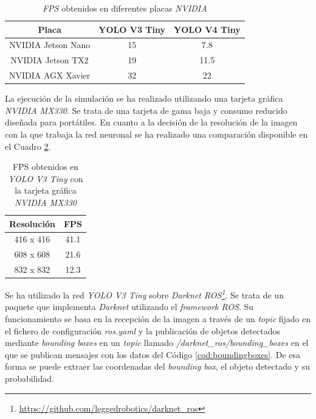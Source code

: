 \begin{table}[H]
	\begin{center}
		\begin{tabular}{|c|c|c|}
			\hline
			\textbf{Placa}   & \textbf{YOLO V3 Tiny}  & \textbf{YOLO V4 Tiny}
			\\
			\hline
			NVIDIA Jetson Nano						& 15									& 7.8
			\\																						
			NVIDIA Jetson TX2   					& 19									& 11.5
			\\
			NVIDIA AGX Xavier     				& 32									& 22
			\\
			\hline
		\end{tabular}
		\caption{\textit{FPS} obtenidos en diferentes placas \textit{NVIDIA}}
		\label{table:v3vsv4}
	\end{center}
\end{table}

La ejecución de la simulación se ha realizado utilizando una tarjeta gráfica \textit{NVIDIA MX330}. Se trata de una tarjeta de gama baja y consumo reducido diseñada para portátiles. En cuanto a la decisión de la resolución de la imagen con la que trabaja la red neuronal se ha realizado una comparación disponible en el Cuadro \ref{table:versusnotebook}.\\

\begin{table}[H]
	\begin{center}
		\begin{tabular}{|c|c|}
			\hline
			\textbf{Resolución}   & \textbf{FPS}
			\\
			\hline
			416 x 416							& 41.1
			\\
			608 x 608    					& 21.6
			\\
			832 x 832      				& 12.3
			\\
			\hline
		\end{tabular}
		\caption{FPS obtenidos en \textit{YOLO V3 Tiny} con la tarjeta gráfica \textit{NVIDIA MX330}}
		\label{table:versusnotebook}
	\end{center}
\end{table}

Se ha utilizado la red \textit{YOLO V3 Tiny} sobre \textit{Darknet ROS\footnote{\url{https://github.com/leggedrobotics/darknet_ros}}}. Se trata de un paquete que implementa \textit{Darknet} utilizando el \textit{framework ROS}. Su funcionamiento se basa en la recepción de la imagen a través de un \textit{topic} fijado en el fichero de configuración \textit{ros.yaml} y la publicación de objetos detectados mediante \textit{bounding boxes} en un \textit{topic} llamado \textit{/darknet\_ros/bounding\_boxes} en el que se publican mensajes con los datos del Código \ref{cod:boundingboxes}. De esa forma se puede extraer las coordenadas del \textit{bounding box}, el objeto detectado y su probabilidad.\\

